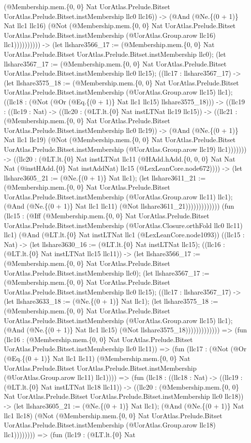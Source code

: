 \documentclass[11pt]{article}
\begin{document}
(@Membership.mem.\{0, 0\} Nat UorAtlas.Prelude.Bitset UorAtlas.Prelude.Bitset.instMembership llc0 llc16)) -> (@And (@Ne.\{(0 + 1)\} Nat llc1 llc16) (@Not (@Membership.mem.\{0, 0\} Nat UorAtlas.Prelude.Bitset UorAtlas.Prelude.Bitset.instMembership (@UorAtlas.Group.arow llc16) llc1)))))))))) -> (let llshare3566\_17 := (@Membership.mem.\{0, 0\} Nat UorAtlas.Prelude.Bitset UorAtlas.Prelude.Bitset.instMembership llc0); (let llshare3567\_17 := (@Membership.mem.\{0, 0\} Nat UorAtlas.Prelude.Bitset UorAtlas.Prelude.Bitset.instMembership llc0 llc15); ((llc17 : llshare3567\_17) -> (let llshare3575\_18 := (@Membership.mem.\{0, 0\} Nat UorAtlas.Prelude.Bitset UorAtlas.Prelude.Bitset.instMembership (@UorAtlas.Group.arow llc15) llc1); ((llc18 : (@Not (@Or (@Eq.\{(0 + 1)\} Nat llc1 llc15) llshare3575\_18))) -> ((llc19 : ((llc19 : Nat) -> ((llc20 : (@LT.lt.\{0\} Nat instLTNat llc19 llc15)) -> ((llc21 : (@Membership.mem.\{0, 0\} Nat UorAtlas.Prelude.Bitset UorAtlas.Prelude.Bitset.instMembership llc0 llc19)) -> (@And (@Ne.\{(0 + 1)\} Nat llc1 llc19) (@Not (@Membership.mem.\{0, 0\} Nat UorAtlas.Prelude.Bitset UorAtlas.Prelude.Bitset.instMembership (@UorAtlas.Group.arow llc19) llc1))))))) -> ((llc20 : (@LT.lt.\{0\} Nat instLTNat llc11 (@HAdd.hAdd.\{0, 0, 0\} Nat Nat Nat (@instHAdd.\{0\} Nat instAddNat) llc15 (@LexLeanCore.node672)))) -> (let llshare3605\_21 := (@Ne.\{(0 + 1)\} Nat llc1); (let llshare3611\_21 := (@Membership.mem.\{0, 0\} Nat UorAtlas.Prelude.Bitset UorAtlas.Prelude.Bitset.instMembership (@UorAtlas.Group.arow llc11) llc1); (@And (@Ne.\{(0 + 1)\} Nat llc1 llc11) (@Not llshare3611\_21))))))))))))) (fun (llc15 : (@Iff (@Membership.mem.\{0, 0\} Nat UorAtlas.Prelude.Bitset UorAtlas.Prelude.Bitset.instMembership (@UorAtlas.Closure.orthFold llc0 llc11) llc1) (@And (@LT.lt.\{0\} Nat instLTNat llc1 (@LexLeanCore.node1093)) ((llc15 : Nat) -> (let llshare3630\_16 := (@LT.lt.\{0\} Nat instLTNat llc15); ((llc16 : (@LT.lt.\{0\} Nat instLTNat llc15 llc11)) -> (let llshare3566\_17 := (@Membership.mem.\{0, 0\} Nat UorAtlas.Prelude.Bitset UorAtlas.Prelude.Bitset.instMembership llc0); (let llshare3567\_17 := (@Membership.mem.\{0, 0\} Nat UorAtlas.Prelude.Bitset UorAtlas.Prelude.Bitset.instMembership llc0 llc15); ((llc17 : llshare3567\_17) -> (let llshare3633\_18 := (@Ne.\{(0 + 1)\} Nat llc1); (let llshare3575\_18 := (@Membership.mem.\{0, 0\} Nat UorAtlas.Prelude.Bitset UorAtlas.Prelude.Bitset.instMembership (@UorAtlas.Group.arow llc15) llc1); (@And (@Ne.\{(0 + 1)\} Nat llc1 llc15) (@Not llshare3575\_18))))))))))))) => (fun (llc16 : (@Membership.mem.\{0, 0\} Nat UorAtlas.Prelude.Bitset UorAtlas.Prelude.Bitset.instMembership llc0 llc11)) => (fun (llc17 : (@Not (@Or (@Eq.\{(0 + 1)\} Nat llc1 llc11) (@Membership.mem.\{0, 0\} Nat UorAtlas.Prelude.Bitset UorAtlas.Prelude.Bitset.instMembership (@UorAtlas.Group.arow llc11) llc1)))) => (fun (llc18 : ((llc18 : Nat) -> ((llc19 : (@LT.lt.\{0\} Nat instLTNat llc18 llc11)) -> ((llc20 : (@Membership.mem.\{0, 0\} Nat UorAtlas.Prelude.Bitset UorAtlas.Prelude.Bitset.instMembership llc0 llc18)) -> (let llshare3605\_21 := (@Ne.\{(0 + 1)\} Nat llc1); (@And (@Ne.\{(0 + 1)\} Nat llc1 llc18) (@Not (@Membership.mem.\{0, 0\} Nat UorAtlas.Prelude.Bitset UorAtlas.Prelude.Bitset.instMembership (@UorAtlas.Group.arow llc18) llc1)))))))) => (fun (llc19 : (@LT.lt.\{0\} Nat 
\end{document}
